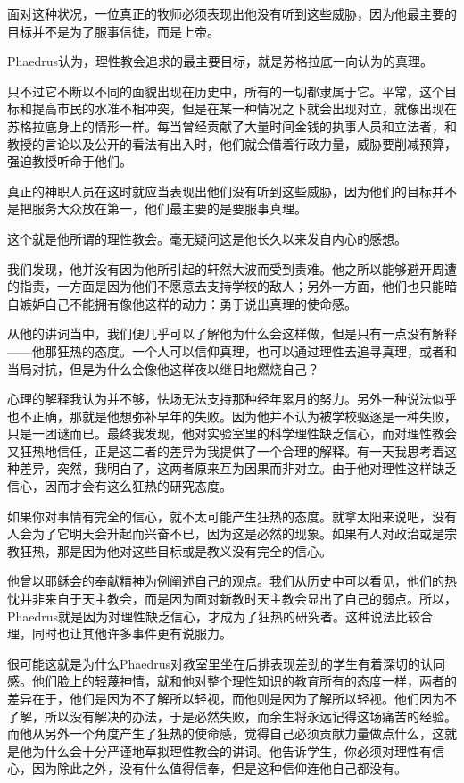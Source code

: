 \documentclass[UTF8]{article}
\begin{document}
\par 面对这种状况，一位真正的牧师必须表现出他没有听到这些威胁，因为他最主要的目标并不是为了服事信徒，而是上帝。
\par Phaedrus认为，理性教会追求的最主要目标，就是苏格拉底一向认为的真理。
\par 只不过它不断以不同的面貌出现在历史中，所有的一切都隶属于它。平常，这个目标和提高市民的水准不相冲突，但是在某一种情况之下就会出现对立，就像出现在苏格拉底身上的情形一样。每当曾经贡献了大量时间金钱的执事人员和立法者，和教授的言论以及公开的看法有出入时，他们就会借着行政力量，威胁要削减预算，强迫教授听命于他们。
\par 真正的神职人员在这时就应当表现出他们没有听到这些威胁，因为他们的目标并不是把服务大众放在第一，他们最主要的是要服事真理。
\par 这个就是他所谓的理性教会。毫无疑问这是他长久以来发自内心的感想。
\par 我们发现，他并没有因为他所引起的轩然大波而受到责难。他之所以能够避开周遭的指责，一方面是因为他们不愿意去支持学校的敌人；另外一方面，他们也只能暗自嫉妒自己不能拥有像他这样的动力：勇于说出真理的使命感。
\par 从他的讲词当中，我们便几乎可以了解他为什么会这样做，但是只有一点没有解释——他那狂热的态度。一个人可以信仰真理，也可以通过理性去追寻真理，或者和当局对抗，但是为什么会像他这样夜以继日地燃烧自己？
\par 心理的解释我认为并不够，怯场无法支持那种经年累月的努力。另外一种说法似乎也不正确，那就是他想弥补早年的失败。因为他并不认为被学校驱逐是一种失败，只是一团谜而已。最终我发现，他对实验室里的科学理性缺乏信心，而对理性教会又狂热地信任，正是这二者的差异为我提供了一个合理的解释。有一天我思考着这种差异，突然，我明白了，这两者原来互为因果而非对立。由于他对理性这样缺乏信心，因而才会有这么狂热的研究态度。
\par 如果你对事情有完全的信心，就不太可能产生狂热的态度。就拿太阳来说吧，没有人会为了它明天会升起而兴奋不已，因为这是必然的现象。如果有人对政治或是宗教狂热，那是因为他对这些目标或是教义没有完全的信心。
\par 他曾以耶稣会的奉献精神为例阐述自己的观点。我们从历史中可以看见，他们的热忱并非来自于天主教会，而是因为面对新教时天主教会显出了自己的弱点。所以，Phaedrus就是因为对理性缺乏信心，才成为了狂热的研究者。这种说法比较合理，同时也让其他许多事件更有说服力。
\par 很可能这就是为什么Phaedrus对教室里坐在后排表现差劲的学生有着深切的认同感。他们脸上的轻蔑神情，就和他对整个理性知识的教育所有的态度一样，两者的差异在于，他们是因为不了解所以轻视，而他则是因为了解所以轻视。他们因为不了解，所以没有解决的办法，于是必然失败，而余生将永远记得这场痛苦的经验。而他从另外一个角度产生了狂热的使命感，觉得自己必须贡献力量做点什么，这就是他为什么会十分严谨地草拟理性教会的讲词。他告诉学生，你必须对理性有信心，因为除此之外，没有什么值得信奉，但是这种信仰连他自己都没有。
\end{document}
